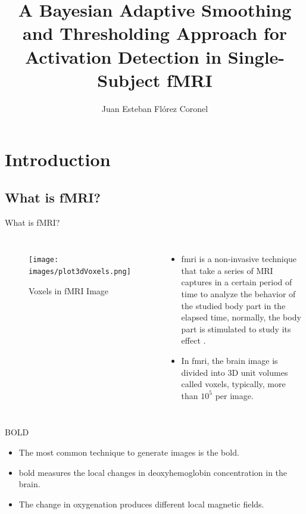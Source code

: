 \documentclass{beamer}
\title[BFAST in Single-Subject fMRI]{A Bayesian Adaptive Smoothing and 
Thresholding Approach for Activation Detection in 
Single-Subject fMRI}
\author[J. Flórez-Coronel]{Juan Esteban Flórez Coronel}
\begin{document}
\typesetFrontSlides


\section{Introduction}

\subsection[fMRI]{What is fMRI?}

\begin{frame}{What is fMRI?}
\begin{columns}
\begin{figure}
\centering
\texttt{[image: images/plot3dVoxels.png]}
\caption{Voxels in fMRI Image}
\label{fig:fMRI}
\end{figure}
\begin{itemize}
\item \acrfull{fmri} is a non-invasive technique that take a series of MRI captures
in a certain period of time to analyze the behavior of the studied body part 
in the elapsed time, normally, the body part is stimulated to study its effect
 \cite{buchbinder2016functional}.
\item In \gls{fmri}, the brain image is divided into 3D unit volumes called voxels, 
typically, more than $10^5$ per image.
\end{itemize}
\end{columns}
\end{frame}

\begin{frame}{BOLD}
\begin{itemize}
\item The most common technique to generate images is the \acrfull{bold}.
\item \gls{bold} measures the local changes in deoxyhemoglobin 
concentration in the brain.
\item The change in oxygenation produces different local magnetic fields.
\end{itemize}
\end{frame}
\end{document}
